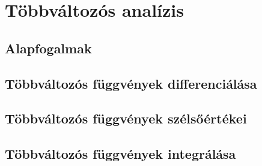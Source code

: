 \documentclass[b5paper, 10pt, twoside]{scrbook}
\begin{document}
\clearpage
\chapter{Többváltozós analízis}

\clearpage
\section{Alapfogalmak}

\clearpage
\section{Többváltozós függvények differenciálása}

\clearpage
\section{Többváltozós függvények szélsőértékei}

\clearpage
\section{Többváltozós függvények integrálása}
\end{document}
